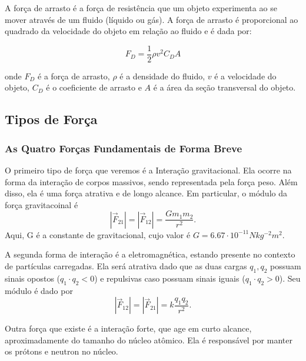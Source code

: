 \documentclass{article}
\begin{document}
A força de arrasto é a força de resistência que um objeto experimenta ao se mover através de um fluido (líquido ou gás). A força de arrasto é proporcional ao quadrado da velocidade do objeto em relação ao fluido e é dada por:

\begin{equation}
F_D = \frac{1}{2} \rho v^2 C_D A
\end{equation}

onde $F_D$ é a força de arrasto, $\rho$ é a densidade do fluido, $v$ é a velocidade do objeto, $C_D$ é o coeficiente de arrasto e $A$ é a área da seção transversal do objeto.

\begin{center}
\end{center}

\subsection{Tipos de For\c ca}
\subsubsection{As Quatro For\c cas Fundamentais de Forma Breve}
O primeiro tipo de for\c ca que veremos \'e a Intera\c c\~ao gravitacional. Ela ocorre na forma da intera\c c\~ao de corpos massivos,
sendo representada pela for\c ca peso. Al\'em disso, ela \'e uma for\c ca atrativa e de longo alcance. Em particular, o m\'odulo da 
for\c ca gravitacoinal \'e 
  $$
    |\vec{F}_{21}| = |\vec{F}_{12}| = \frac{Gm_{1}m_{2}}{r^{2}}.
  $$
  Aqui, G \'e a constante de gravitacional, cujo valor \'e $G=6.67 \cdot 10^{-11}Nkg^{-2}m^{2}.$

  A segunda forma de intera\c c\~ao \'e a eletromagn\'etica, estando presente no contexto de part\'iculas carregadas. Ela ser\'a 
  atrativa dado que as duas cargas $q_{1}, q_{2}$ possuam sinais opostos ($q_{1}\cdot q_{2}<0$) e repulsivas caso possuam sinais
  iguais ($q_{1}\cdot q_{2}>0$). Seu m\'odulo \'e dado por 
    $$
      |\vec{F}_{12}|=|\vec{F}_{21}|=k\frac{q_{1}q_{2}}{r^{2}}.
    $$

  Outra for\c ca que existe \'e a intera\c c\~ao forte, que age em curto alcance, aproximadamente do tamanho do n\'ucleo at\^omico.
  Ela \'e respons\'avel por manter os pr\'otons e neutron no n\'ucleo.
\end{document}
